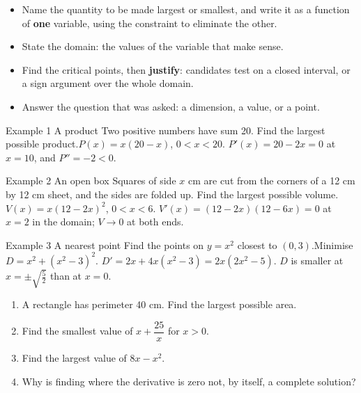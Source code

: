 \documentclass[11pt]{article}
\begin{document}

\begin{ideabox}
\begin{itemize}[leftmargin=*,itemsep=2pt,topsep=2pt]
  \item Name the quantity to be made largest or smallest, and write it as a function of \textbf{one} variable, using the constraint to eliminate the other.
  \item State the domain: the values of the variable that make sense.
  \item Find the critical points, then \textbf{justify}: candidates test on a closed interval, or a sign argument over the whole domain.
  \item Answer the question that was asked: a dimension, a value, or a point.
\end{itemize}
\end{ideabox}

\begin{example}{Example 1 \textperiodcentered{} A product}
Two positive numbers have sum 20. Find the largest possible product.\soln $P(x)=x(20-x)$, $0<x<20$. $P'(x)=20-2x=0$ at $x=10$, and $P''=-2<0$.
\end{example}

\begin{example}{Example 2 \textperiodcentered{} An open box}
Squares of side $x$ cm are cut from the corners of a 12 cm by 12 cm sheet, and the sides are folded up. Find the largest possible volume.\soln $V(x)=x(12-2x)^2$, $0<x<6$. $V'(x)=(12-2x)(12-6x)=0$ at $x=2$ in the domain; $V\to0$ at both ends.
\end{example}

\begin{example}{Example 3 \textperiodcentered{} A nearest point}
Find the points on $y=x^2$ closest to $(0,3)$.\soln Minimise $D=x^2+\left(x^2-3\right)^2$. $D'=2x+4x\left(x^2-3\right)=2x\left(2x^2-5\right)$. $D$ is smaller at $x=\pm\sqrt{\tfrac52}$ than at $x=0$.
\end{example}

\newpage
{}

\begin{enumerate}[leftmargin=*,itemsep=2pt]
  \item A rectangle has perimeter 40 cm. Find the largest possible area.\work{2.3cm}
  \item Find the smallest value of $x+\dfrac{25}{x}$ for $x>0$.\work{2.3cm}
  \item Find the largest value of $8x-x^2$.\work{2.3cm}
  \item Why is finding where the derivative is zero not, by itself, a complete solution?\work{2.3cm}
\end{enumerate}
\end{document}
